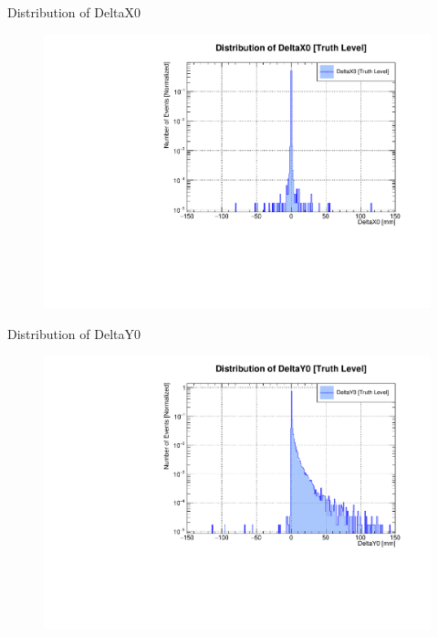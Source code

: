 \begin{frame}{Distribution of DeltaX0}
	\begin{figure}
		\includegraphics[width=\linewidth]{./output/DeltaX0.pdf}
	\end{figure}
\end{frame}

\begin{frame}{Distribution of DeltaY0}
	\begin{figure}
		\includegraphics[width=\linewidth]{./output/DeltaY0.pdf}
	\end{figure}
\end{frame}

